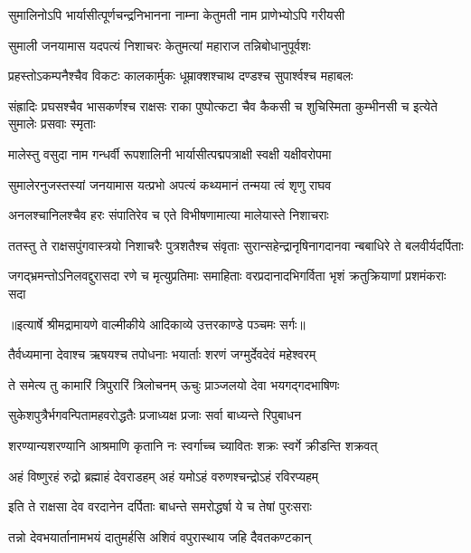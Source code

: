 \twolineshloka
{सुमालिनोऽपि भार्यासीत्पूर्णचन्द्रनिभानना}
{नाम्ना केतुमती नाम प्राणेभ्योऽपि गरीयसी} %

\twolineshloka
{सुमाली जनयामास यदपत्यं निशाचरः}
{केतुमत्यां महाराज तन्निबोधानुपूर्वशः} %

\twolineshloka
{प्रहस्तोऽकम्पनैश्चैव विकटः कालकार्मुकः}
{धूम्राक्शश्चाथ दण्डश्च सुपार्श्वश्च महाबलः} %

\threelineshloka
{संह्रादिः प्रघसश्चैव भासकर्णश्च राक्षसः}
{राका पुष्पोत्कटा चैव कैकसी च शुचिस्मिता}
{कुम्भीनसी च इत्येते सुमालेः प्रसवाः स्मृताः} %

\twolineshloka
{मालेस्तु वसुदा नाम गन्धर्वी रूपशालिनी}
{भार्यासीत्पद्मपत्राक्षी स्वक्षी यक्षीवरोपमा} %

\twolineshloka
{सुमालेरनुजस्तस्यां जनयामास यत्प्रभो}
{अपत्यं कथ्यमानं तन्मया त्वं शृणु राघव} %

\twolineshloka
{अनलश्चानिलश्चैव हरः संपातिरेव च}
{एते विभीषणामात्या मालेयास्ते निशाचराः} %

\fourlineindentedshloka
{ततस्तु ते राक्षसपुंगवास्त्रयो}
{ निशाचरैः पुत्रशतैश्च संवृताः}
{सुरान्सहेन्द्रानृषिनागदानवा}
{न्बबाधिरे ते बलवीर्यदर्पिताः} %

\fourlineindentedshloka
{जगद्भ्रमन्तोऽनिलवद्दुरासदा}
{ रणे च मृत्युप्रतिमाः समाहिताः}
{वरप्रदानादभिगर्विता भृशं}
{ क्रतुक्रियाणां प्रशमंकराः सदा} %


{॥इत्यार्षे श्रीमद्रामायणे वाल्मीकीये आदिकाव्ये उत्तरकाण्डे पञ्चमः सर्गः॥}


\twolineshloka
{तैर्वध्यमाना देवाश्च ऋषयश्च तपोधनाः}
{भयार्ताः शरणं जग्मुर्देवदेवं महेश्वरम्} %

\twolineshloka
{ते समेत्य तु कामारिं त्रिपुरारिं त्रिलोचनम्}
{ऊचुः प्राञ्जलयो देवा भयगद्गदभाषिणः} %

\twolineshloka
{सुकेशपुत्रैर्भगवन्पितामहवरोद्धतैः}
{प्रजाध्यक्ष प्रजाः सर्वा बाध्यन्ते रिपुबाधन} %

\twolineshloka
{शरण्यान्यशरण्यानि आश्रमाणि कृतानि नः}
{स्वर्गाच्च च्यावितः शक्रः स्वर्गे क्रीडन्ति शक्रवत्} %

\twolineshloka
{अहं विष्णुरहं रुद्रो ब्रह्माहं देवराडहम्}
{अहं यमोऽहं वरुणश्चन्द्रोऽहं रविरप्यहम्} %

\twolineshloka
{इति ते राक्षसा देव वरदानेन दर्पिताः}
{बाधन्ते समरोद्धर्षा ये च तेषां पुरःसराः} %

\twolineshloka
{तन्नो देवभयार्तानामभयं दातुमर्हसि}
{अशिवं वपुरास्थाय जहि दैवतकण्टकान्} %

